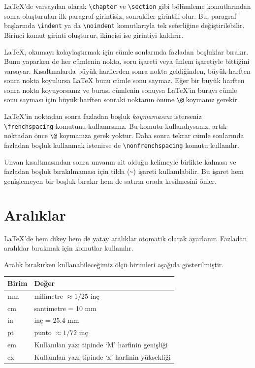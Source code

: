 \documentclass[
  10pt,
]{scrbook}
\theoremstyle{definition}
\theoremstyle{definition}
\theoremstyle{definition}
\theoremstyle{definition}
\theoremstyle{remark}
\begin{document}
LaTeX'de varsayılan olarak \texttt{\textbackslash{}chapter} ve \texttt{\textbackslash{}section} gibi bölümleme komutlarından sonra oluşturulan ilk paragraf girintisiz, sonrakiler girintili olur. Bu, paragraf başlarında \texttt{\textbackslash{}indent} ya da \texttt{\textbackslash{}noindent} komutlarıyla tek seferliğine değiştirilebilir. Birinci komut girinti oluşturur, ikincisi ise girintiyi kaldırır.

LaTeX, okumayı kolaylaştırmak için cümle sonlarında fazladan boşluklar bırakır. Bunu yaparken de her cümlenin nokta, soru işareti veya ünlem işaretiyle bittiğini varsayar. Kısaltmalarda büyük harflerden sonra nokta geldiğinden, büyük harften sonra nokta koyulursa LaTeX bunu cümle sonu saymaz. Eğer bir büyük harften sonra nokta koyuyorsanız ve burası cümlenin sonuysa LaTeX'in burayı cümle sonu sayması için büyük harften sonraki noktanın önüne \texttt{\textbackslash{}@} koymanız gerekir.

LaTeX'in noktadan sonra fazladan boşluk \emph{koymamasını} isterseniz \texttt{\textbackslash{}frenchspacing} komutunu kullanırsınız. Bu komutu kullandıysanız, artık noktadan önce \texttt{\textbackslash{}@} koymanıza gerek yoktur. Daha sonra tekrar cümle sonlarında fazladan boşluk kullanmak istenirse de \texttt{\textbackslash{}nonfrenchspacing} komutu kullanılır.

Unvan kısaltmasından sonra unvanın ait olduğu kelimeyle birlikte kalması ve fazladan boşluk bırakılmaması için tilda (\texttt{\textasciitilde{}}) işareti kullanılabilir. Bu işaret hem genişlemeyen bir boşluk bırakır hem de satırın orada kesilmesini önler.

\hypertarget{aralux131klar}{%
\section{Aralıklar}\label{aralux131klar}}

LaTeX'de hem dikey hem de yatay aralıklar otomatik olarak ayarlanır. Fazladan aralıklar bırakmak için komutlar kullanılır.

Aralık bırakırken kullanabileceğimiz ölçü birimleri aşağıda gösterilmiştir.

\begin{longtable}[]{@{}ll@{}}
\toprule
Birim & Değer \\
\midrule
\endhead
mm & milimetre \(\approx 1/25\) inç \\
cm & santimetre = 10 mm \\
in & inç = 25.4 mm \\
pt & punto \(\approx 1/72\) inç \\
em & Kullanılan yazı tipinde `M' harfinin genişliği \\
ex & Kullanılan yazı tipinde `x' harfinin yüksekliği \\
\bottomrule
\end{longtable}
\end{document}
